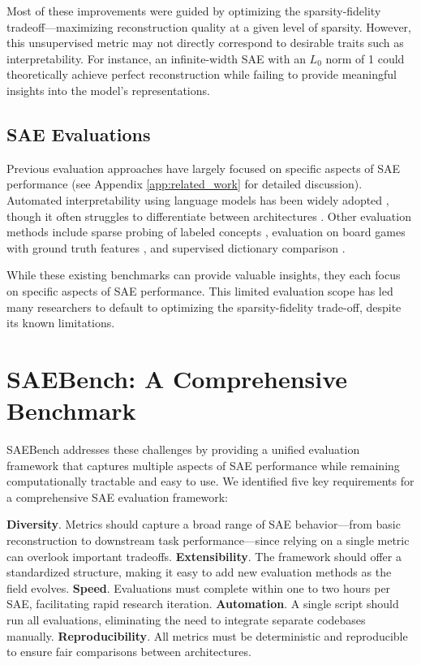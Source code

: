 \documentclass{article}
\theoremstyle{plain}
\theoremstyle{definition}
\theoremstyle{remark}
\begin{document}
Most of these improvements were guided by optimizing the sparsity-fidelity tradeoff—maximizing reconstruction quality at a given level of sparsity. However, this unsupervised metric may not directly correspond to desirable traits such as interpretability. For instance, an infinite-width SAE with an $L_0$ norm of 1 could theoretically achieve perfect reconstruction while failing to provide meaningful insights into the model's representations.

\subsection{SAE Evaluations}
Previous evaluation approaches have largely focused on specific aspects of SAE performance (see Appendix \ref{app:related_work} for detailed discussion). Automated interpretability using language models has been widely adopted \cite{paulo2024automaticallyinterpretingmillionsfeatures, rajamanoharan2024jumping}, though it often struggles to differentiate between architectures \cite{circuits2024august}. Other evaluation methods include sparse probing of labeled concepts \cite{gao2024scaling}, evaluation on board games with ground truth features \cite{karvonen2024measuringprogressdictionarylearning}, and supervised dictionary comparison \cite{makelov2024principledevaluationssparseautoencoders, venhoff2024sagescalablegroundtruth}.

While these existing benchmarks can provide valuable insights, they each focus on specific aspects of SAE performance. This limited evaluation scope has led many researchers to default to optimizing the sparsity-fidelity trade-off, despite its known limitations.

\section{SAEBench: A Comprehensive Benchmark}

SAEBench addresses these challenges by providing a unified evaluation framework that captures multiple aspects of SAE performance while remaining computationally tractable and easy to use. We identified five key requirements for a comprehensive SAE evaluation framework:

\textbf{Diversity}. Metrics should capture a broad range of SAE behavior—from basic reconstruction to downstream task performance—since relying on a single metric can overlook important tradeoffs. 
\textbf{Extensibility}. The framework should offer a standardized structure, making it easy to add new evaluation methods as the field evolves. 
\textbf{Speed}. Evaluations must complete within one to two hours per SAE, facilitating rapid research iteration. 
\textbf{Automation}. A single script should run all evaluations, eliminating the need to integrate separate codebases manually. 
\textbf{Reproducibility}. All metrics must be deterministic and reproducible to ensure fair comparisons between architectures.
\end{document}
